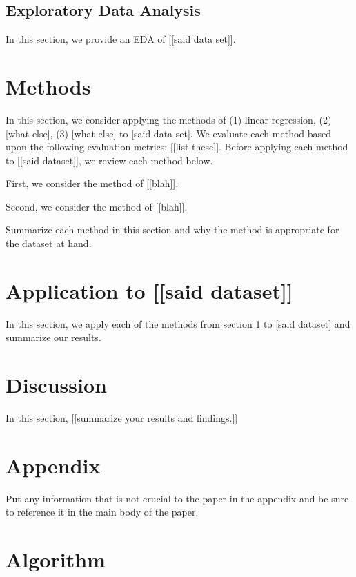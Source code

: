 \documentclass[11pt]{llncs}\usepackage[]{graphicx}\usepackage[]{color}
\begin{document}
\subsection{Exploratory Data Analysis}
\label{sec:eda}
In this section, we provide an EDA of [[said data set]].

\section{Methods}
\label{sec:methods}
In this section, we consider applying the methods of (1) linear regression, (2) [what else], (3) [what else] to [said data set]. We evaluate each method based upon the following evaluation metrics: [[list these]]. Before applying each method to [[said dataset]], we review each method below.

First, we consider the method of [[blah]].

Second, we consider the method of [[blah]].

Summarize each method in this section and why the method is appropriate for the dataset at hand.

\section{Application to [[said dataset]]}
\label{sec:application}
In this section, we apply each of the methods from section \ref{sec:methods} to [said dataset] and summarize our results.


\section{Discussion}
\label{sec:discussion}
In this section, [[summarize your results and findings.]]

\newpage

\footnotesize{


}

\newpage

\section*{Appendix}
\appendix

Put any information that is not crucial to the paper in the appendix and
be sure to reference it in the main body of the paper.

\section{Algorithm}
\label{sec:appendix-a}
\end{document}
